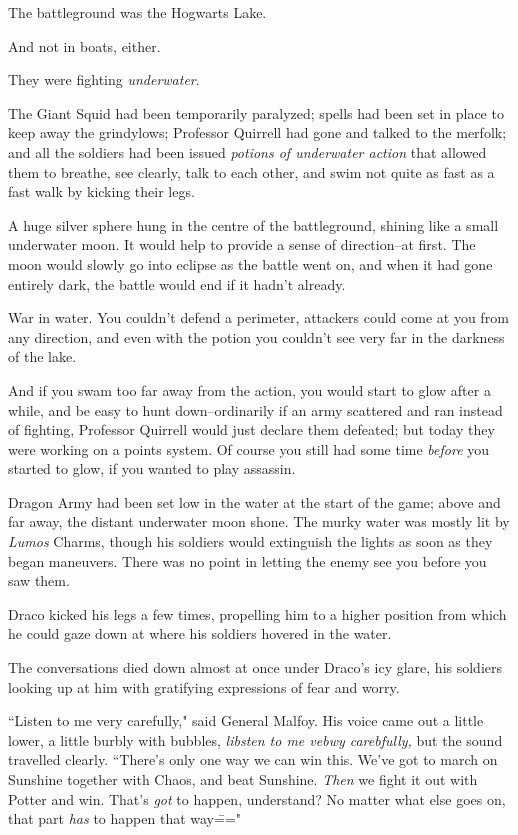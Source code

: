 The battleground was the Hogwarts Lake.

And not in boats, either.

They were fighting \emph{underwater}.

The Giant Squid had been temporarily paralyzed; spells had been set in place to keep away the grindylows; Professor Quirrell had gone and talked to the merfolk; and all the soldiers had been issued \emph{potions of underwater action} that allowed them to breathe, see clearly, talk to each other, and swim not quite as fast as a fast walk by kicking their legs.

A huge silver sphere hung in the centre of the battleground, shining like a small underwater moon. It would help to provide a sense of direction\---at first. The moon would slowly go into eclipse as the battle went on, and when it had gone entirely dark, the battle would end if it hadn't already.

War in water. You couldn't defend a perimeter, attackers could come at you from any direction, and even with the potion you couldn't see very far in the darkness of the lake.

And if you swam too far away from the action, you would start to glow after a while, and be easy to hunt down\---ordinarily if an army scattered and ran instead of fighting, Professor Quirrell would just declare them defeated; but today they were working on a points system. Of course you still had some time \emph{before} you started to glow, if you wanted to play assassin.

Dragon Army had been set low in the water at the start of the game; above and far away, the distant underwater moon shone. The murky water was mostly lit by \emph{Lumos} Charms, though his soldiers would extinguish the lights as soon as they began maneuvers. There was no point in letting the enemy see you before you saw them.

Draco kicked his legs a few times, propelling him to a higher position from which he could gaze down at where his soldiers hovered in the water.

The conversations died down almost at once under Draco's icy glare, his soldiers looking up at him with gratifying expressions of fear and worry.

``Listen to me very carefully," said General Malfoy. His voice came out a little lower, a little burbly with bubbles, \emph{libsten to me vebwy carebfully,} but the sound travelled clearly. ``There's only one way we can win this. We've got to march on Sunshine together with Chaos, and beat Sunshine. \emph{Then} we fight it out with Potter and win. That's \emph{got} to happen, understand? No matter what else goes on, that part \emph{has} to happen that way\==="

